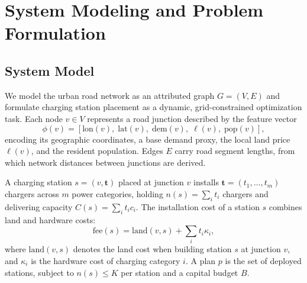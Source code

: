 \documentclass[graybox]{svmult}
\begin{document}
\section{System Modeling and Problem Formulation}
\label{sec:model}
\subsection{System Model}
\label{subsec:network}
We model the urban road network as an attributed graph $G=(V,E)$ and formulate charging station placement as a dynamic, grid-constrained optimization task. Each node $v \in V$ represents a road junction described by the feature vector
\begin{equation}
\phi(v)=
\left[
\mathrm{lon}(v),\;
\mathrm{lat}(v),\;
\mathrm{dem}(v),\;
\ell(v),\;
\mathrm{pop}(v)
\right],
\end{equation}
encoding its geographic coordinates, a base demand proxy, the local land price $\ell(v)$, and the resident population. Edges $E$ carry road segment lengths, from which network distances between junctions are derived.

A charging station $s=(v,\mathbf{t})$ placed at junction $v$ installs $\mathbf{t}=(t_1,\dots,t_m)$ chargers across $m$ power categories, holding $n(s)=\sum_i t_i$ chargers and delivering capacity $C(s)=\sum_i t_i c_i$. The installation cost of a station $s$ combines land and hardware costs:
\begin{equation}
\label{eq}
\mathrm{fee}(s)=\mathrm{land}(v, s)+\sum_i t_i\kappa_i,
\end{equation}
where $\mathrm{land}(v,s)$ denotes the land cost when building station $s$ at junction $v$, and $\kappa_i$ is the hardware cost of charging category $i$. A plan $p$ is the set of deployed stations, subject to $n(s)\le K$ per station and a capital budget $B$.
\end{document}
